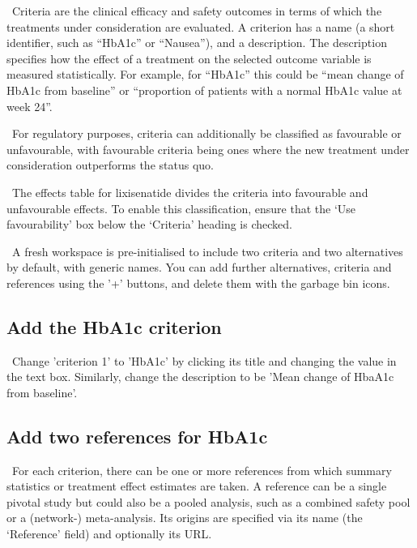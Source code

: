 \documentclass[00_mcda_tutorial.tex]{subfiles}
\begin{document}
\noindent \faGraduationCap \, Criteria are the clinical efficacy and safety outcomes in terms of which the treatments under consideration are evaluated. A criterion has a name (a short identifier, such as  “HbA1c” or “Nausea”), and a description. The description specifies how the effect of a treatment on the selected outcome variable is measured statistically. For example, for “HbA1c” this could be “mean change of HbA1c from baseline” or “proportion of patients with a normal HbA1c value at week 24”.
\newline

\noindent \faGraduationCap \, For regulatory purposes, criteria can additionally be classified as favourable or unfavourable, with favourable criteria being ones where the new treatment under consideration outperforms the status quo.
\newline


\noindent \leftpointright \, The effects table for lixisenatide divides the criteria into favourable and unfavourable effects. To enable this classification, ensure that the ‘Use favourability’ box below the ‘Criteria’ heading is checked.
\newline

\noindent \faGraduationCap \, A fresh workspace is pre-initialised to include two criteria and two alternatives by default, with generic names. You can add further alternatives, criteria and references using the '+' buttons, and delete them with the garbage bin icons.

\subsection*{Add the HbA1c criterion}
\noindent \leftpointright \, Change 'criterion 1' to 'HbA1c' by clicking its title and changing the value in the text box. Similarly, change the description to be 'Mean change of HbaA1c from baseline'.

\subsection*{Add two references for HbA1c}
\noindent \faGraduationCap \, For each criterion, there can be one or more references from which summary statistics or treatment effect estimates are taken. A reference can be a single pivotal study but could also be a pooled analysis, such as a combined safety pool or a (network-) meta-analysis. Its origins are specified via its name (the ‘Reference’ field) and optionally its URL.
\newline
\end{document}

